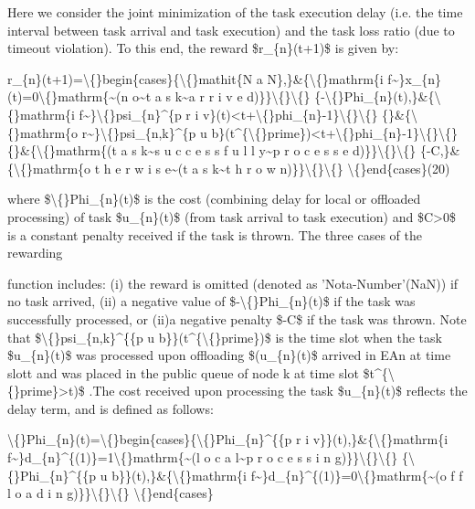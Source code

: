 \documentclass{article}
\begin{document}
Here we consider the joint minimization of the task execution delay (i.e. the time interval between task arrival and task execution) and the task loss ratio (due to timeout violation). To this end, the reward \$r\_\{n\}(t+1)\$ is given by:

r\_\{n\}(t+1)=\textbackslash\{\}begin\{cases\}\{\textbackslash\{\}mathit\{N a N\},\}\&\{\textbackslash\{\}mathrm\{i f\textasciitilde{}\}x\_\{n\}(t)=0\textbackslash\{\}mathrm\{\textasciitilde{}(n o\textasciitilde{}t a s k\textasciitilde{}a r r i v e d)\}\}\textbackslash\{\}\textbackslash\{\} \{-\textbackslash\{\}Phi\_\{n\}(t),\}\&\{\textbackslash\{\}mathrm\{i f\textasciitilde{}\}\textbackslash\{\}psi\_\{n\}\textasciicircum{}\{p r i v\}(t)<t+\textbackslash\{\}phi\_\{n\}-1\}\textbackslash\{\}\textbackslash\{\} \{\}\&\{\textbackslash\{\}mathrm\{o r\textasciitilde{}\}\textbackslash\{\}psi\_\{n,k\}\textasciicircum{}\{p u b\}(t\textasciicircum{}\{\textbackslash\{\}prime\})<t+\textbackslash\{\}phi\_\{n\}-1\}\textbackslash\{\}\textbackslash\{\} \{\}\&\{\textbackslash\{\}mathrm\{(t a s k\textasciitilde{}s u c c e s s f u l l y\textasciitilde{}p r o c e s s e d)\}\}\textbackslash\{\}\textbackslash\{\} \{-C,\}\&\{\textbackslash\{\}mathrm\{o t h e r w i s e\textasciitilde{}(t a s k\textasciitilde{}t h r o w n)\}\}\textbackslash\{\}\textbackslash\{\} \textbackslash\{\}end\{cases\}(20)

where \$\textbackslash\{\}Phi\_\{n\}(t)\$ is the cost (combining delay for local or offloaded processing) of task \$u\_\{n\}(t)\$ (from task arrival to task execution) and \$C>0\$ is a constant penalty received if the task is thrown. The three cases of the rewarding

function includes: (i) the reward is omitted (denoted as 'Nota-Number'(NaN)) if no task arrived, (ii) a negative value of \$-\textbackslash\{\}Phi\_\{n\}(t)\$ if the task was successfully processed, or (ii)a negative penalty \$-C\$ if the task was thrown. Note that \$\textbackslash\{\}psi\_\{n,k\}\textasciicircum{}\{\{p u b\}\}(t\textasciicircum{}\{\textbackslash\{\}prime\})\$ is the time slot when the task \$u\_\{n\}(t)\$ was processed upon offloading \$(u\_\{n\}(t)\$ arrived in EAn at time slott and was placed in the public queue of node k at time slot \$t\textasciicircum{}\{\textbackslash\{\}prime\}>t)\$ .The cost received upon processing the task \$u\_\{n\}(t)\$ reflects the delay term, and is defined as follows:

\textbackslash\{\}Phi\_\{n\}(t)=\textbackslash\{\}begin\{cases\}\{\textbackslash\{\}Phi\_\{n\}\textasciicircum{}\{\{p r i v\}\}(t),\}\&\{\textbackslash\{\}mathrm\{i f\textasciitilde{}\}d\_\{n\}\textasciicircum{}\{(1)\}=1\textbackslash\{\}mathrm\{\textasciitilde{}(l o c a l\textasciitilde{}p r o c e s s i n g)\}\}\textbackslash\{\}\textbackslash\{\} \{\textbackslash\{\}Phi\_\{n\}\textasciicircum{}\{\{p u b\}\}(t),\}\&\{\textbackslash\{\}mathrm\{i f\textasciitilde{}\}d\_\{n\}\textasciicircum{}\{(1)\}=0\textbackslash\{\}mathrm\{\textasciitilde{}(o f f l o a d i n g)\}\}\textbackslash\{\}\textbackslash\{\} \textbackslash\{\}end\{cases\}
\end{document}
